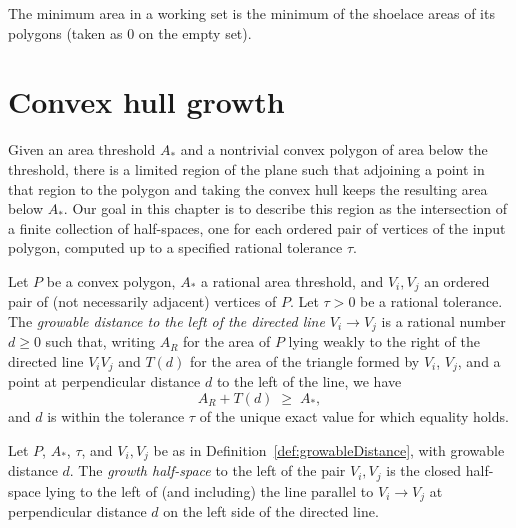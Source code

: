 \begin{definition}
  \label{def:minArea}
  \leanok
  The minimum area in a working set is the minimum of the shoelace areas
  of its polygons (taken as $0$ on the empty set).
\end{definition}

\chapter{Convex hull growth}

Given an area threshold $A_*$ and a nontrivial convex polygon of area below
the threshold, there is a limited region of the plane such that adjoining a
point in that region to the polygon and taking the convex hull keeps the
resulting area below $A_*$. Our goal in this chapter is to describe this
region as the intersection of a finite collection of half-spaces, one for
each ordered pair of vertices of the input polygon, computed up to a
specified rational tolerance $\tau$.

\begin{definition}
  \label{def:growableDistance}
  Let $P$ be a convex polygon, $A_*$ a rational area threshold, and
  $V_i, V_j$ an ordered pair of (not necessarily adjacent) vertices of
  $P$. Let $\tau > 0$ be a rational tolerance. The
  \emph{growable distance to the left of the directed line
  $V_i \to V_j$} is a rational number $d \ge 0$ such that, writing $A_R$
  for the area of $P$ lying weakly to the right of the directed line
  $V_i V_j$ and $T(d)$ for the area of the triangle formed by $V_i$,
  $V_j$, and a point at perpendicular distance $d$ to the left of the
  line, we have
  \[ A_R + T(d) \;\ge\; A_* , \]
  and $d$ is within the tolerance $\tau$ of the unique exact value for
  which equality holds.
\end{definition}

\begin{definition}
  \label{def:growthHalfspace}
  Let $P$, $A_*$, $\tau$, and $V_i, V_j$ be as in
  Definition~\ref{def:growableDistance}, with growable distance $d$.
  The \emph{growth half-space} to the left of the pair $V_i, V_j$ is
  the closed half-space lying to the left of (and including) the line
  parallel to $V_i \to V_j$ at perpendicular distance $d$ on the left
  side of the directed line.
\end{definition}


